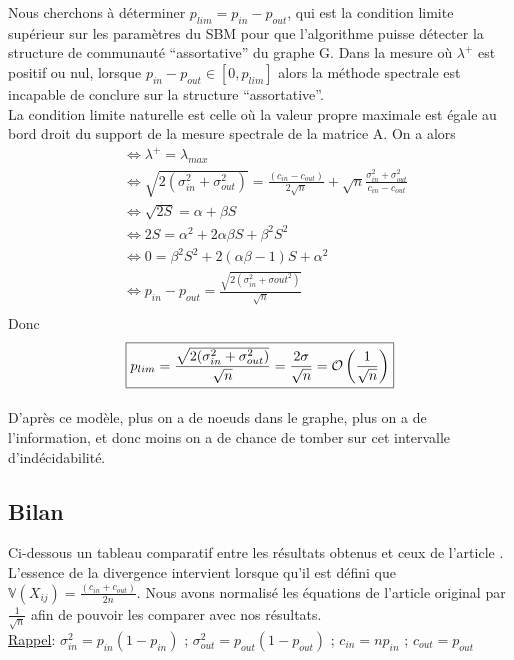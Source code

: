 Nous cherchons à déterminer $p_{lim} = p_{in} - p_{out}$, qui est la condition limite supérieur sur les paramètres du SBM pour que l'algorithme puisse détecter la structure de communauté ``assortative'' du graphe G.
Dans la mesure où  $\lambda^+$ est positif ou nul, lorsque $p_{in} - p_{out} \in [0, p_{lim}]$ alors la méthode spectrale est incapable de conclure sur la structure ``assortative''.\\
 
La condition limite naturelle est celle où la valeur propre maximale est égale au bord droit du support de la mesure spectrale de la matrice A.
On a alors 
\begin{align*}
	&\Leftrightarrow \lambda^+ = \lambda_{max}\\
	&\Leftrightarrow \sqrt{2(\sigma_{in}^2 + \sigma_{out}^2)} = \frac{(c_{in} - c_{out})}{2\sqrt{n}} + \sqrt{n}\frac{\sigma_{in}^2 + \sigma_{out}^2}{c_{in} - c_{out}}\\
	&\Leftrightarrow \sqrt{2S} = \alpha + \beta S\\
	&\Leftrightarrow 2S = \alpha^2 + 2\alpha \beta S +\beta^2 S^2\\
	&\Leftrightarrow 0 = \beta^2 S^2 + 2(\alpha \beta - 1)S+ \alpha^2 \\
	&\Leftrightarrow p_{in} - p_{out} = \frac{\sqrt{2(\sigma_{in}^2 + \sigma{out}^2)}}{\sqrt{n}}  \\
\end{align*}
Donc
\begin{equation}
	\boxed{p_{lim} = \frac{\sqrt{2(\sigma_{in}^2 + \sigma_{out}^2)}}{\sqrt{n}}= \frac{2\sigma}{\sqrt{n}} = \mathcal{O}\left(\frac{1}{\sqrt{n}}\right)}\\
\end{equation}

\paragraph{}\label{rq:ngrand}
D'après ce modèle, plus on a de noeuds dans le graphe, plus on a de l'information, et donc moins on a de chance de tomber sur cet intervalle d’indécidabilité.\\

\subsection{Bilan}
Ci-dessous un tableau comparatif entre les résultats obtenus et ceux de l'article \cite{raj_rao}.
L'essence de la divergence intervient lorsque qu'il est défini que $\mathbb{V}(X_{ij}) = \frac{(c_{in} + c_{out})}{2n}$.
Nous avons normalisé les équations de l'article original par $\frac{1}{\sqrt{n}}$ afin de pouvoir les comparer avec nos résultats.\\
\underline{Rappel}: $\sigma_{in}^2=p_{in}(1-p_{in})$ ; $\sigma_{out}^2=p_{out}(1-p_{out})$ ; $c_{in} = np_{in}$ ; $c_{out} = p_{out}$


